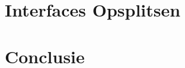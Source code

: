 \documentclass[dutch]{ltugboat}
\begin{document}

    \section{Interfaces Opsplitsen}


    \section{Conclusie}

    \nocite{book-minimal}      %

    \makesignature
\end{document}
